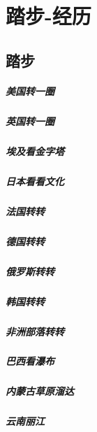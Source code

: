 \documentclass[UTF8,a4paper,8pt]{ctexbook}
\begin{document}
\chapter{踏步-经历}    
    \section{踏步}
	    \paragraph{美国转一圈}
	    \paragraph{英国转一圈}
	    \paragraph{埃及看金字塔}
	    \paragraph{日本看看文化}
	    \paragraph{法国转转}
	    \paragraph{德国转转}
	    \paragraph{俄罗斯转转}
	    \paragraph{韩国转转}
	    \paragraph{非洲部落转转}
	    \paragraph{巴西看瀑布}
	    \paragraph{内蒙古草原溜达}
	    \paragraph{云南丽江}
\end{document}
